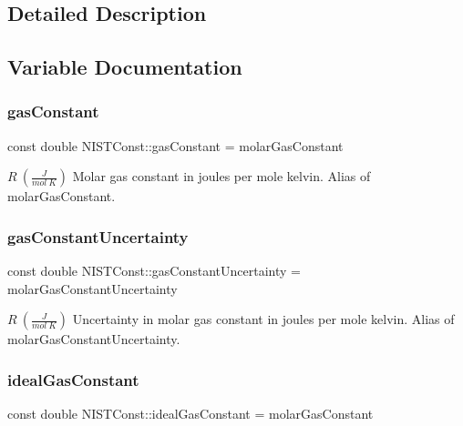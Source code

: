 \subsection{Detailed Description}


\subsection{Variable Documentation}
\mbox{\label{group___n_i_s_t_const-_molar_gas_constant_ga8a80485a1bf8e9acded5ddd69a05084f}} 
\subsubsection{\texorpdfstring{gas\+Constant}{gasConstant}}
{\footnotesize\ttfamily const double N\+I\+S\+T\+Const\+::gas\+Constant = molar\+Gas\+Constant}

$R \ (\frac{J}{mol\ K})$ Molar gas constant in joules per mole kelvin. Alias of molar\+Gas\+Constant. \mbox{\label{group___n_i_s_t_const-_molar_gas_constant_ga6edc72c9e9c859883be07279558df1de}} 
\subsubsection{\texorpdfstring{gas\+Constant\+Uncertainty}{gasConstantUncertainty}}
{\footnotesize\ttfamily const double N\+I\+S\+T\+Const\+::gas\+Constant\+Uncertainty = molar\+Gas\+Constant\+Uncertainty}

$R \ (\frac{J}{mol\ K})$ Uncertainty in molar gas constant in joules per mole kelvin. Alias of molar\+Gas\+Constant\+Uncertainty. \mbox{\label{group___n_i_s_t_const-_molar_gas_constant_ga0315ba6edc63c93914224443ef8a6e17}} 
\subsubsection{\texorpdfstring{ideal\+Gas\+Constant}{idealGasConstant}}
{\footnotesize\ttfamily const double N\+I\+S\+T\+Const\+::ideal\+Gas\+Constant = molar\+Gas\+Constant}

